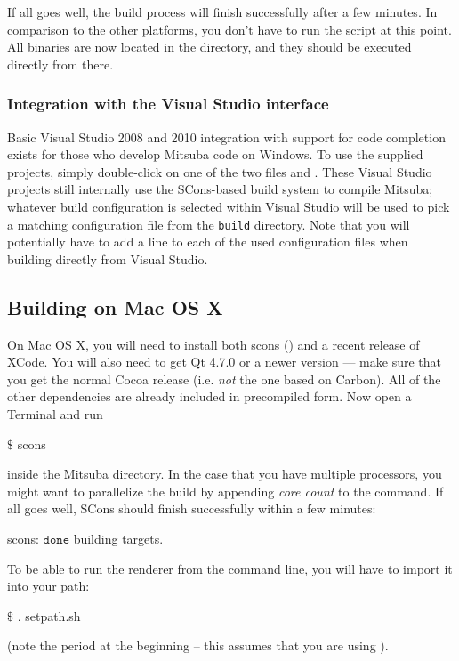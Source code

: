If all goes well, the build process will finish successfully after a few
minutes. In comparison to the other platforms, you don't have to run the  script at this point. 
All binaries are now located in the  directory, and they should be executed directly from there.

\subsubsection{Integration with the Visual Studio interface}
Basic Visual Studio 2008 and 2010 integration with support for code completion 
exists for those who develop Mitsuba code on Windows. 
To use the supplied projects, simply double-click on one of the two files  
and . These Visual Studio projects still internally
use the SCons-based build system to compile Mitsuba; whatever 
build configuration is selected within Visual Studio will be used to pick a matching
configuration file from the \texttt{build} directory. Note that you will
potentially have to add a  line to each of the
used configuration files when building directly from Visual Studio.

\subsection{Building on Mac OS X}
On Mac OS X, you will need to install both scons () and 
a recent release of XCode. You will also need to get Qt 4.7.0 or a newer version
--- make sure that you get the normal Cocoa release (i.e. \emph{not} the one based on Carbon). All of the
other dependencies are already included in precompiled form.
Now open a Terminal and run
\begin{shell}
$\text{\$}$ scons
\end{shell}
inside the Mitsuba directory. In the case that you have multiple processors, you might want to parallelize the build by appending \emph{core count} to the command.
If all goes well, SCons should finish successfully within a few minutes:
\begin{shell}
scons: $\texttt{done}$ building targets.
\end{shell}
To be able to run the renderer from the command line, you will have to import it into your path:
\begin{shell}
$\text{\$}$ . setpath.sh
\end{shell}
(note the period at the beginning -- this assumes that you are using ).
